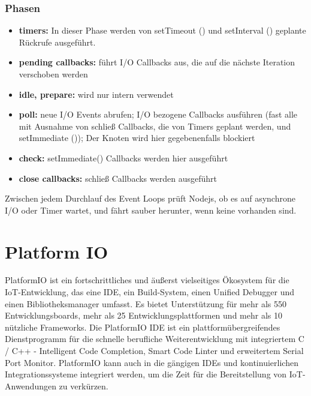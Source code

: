 \subsubsection{Phasen}

\begin{itemize}
    \item \textbf{timers:} In dieser Phase werden von setTimeout () und setInterval () geplante Rückrufe ausgeführt.
    \item \textbf{pending callbacks:} führt I/O Callbacks aus, die auf die nächste Iteration verschoben werden
    \item \textbf{idle, prepare:} wird nur intern verwendet
    \item \textbf{poll:} neue I/O Events abrufen; I/O bezogene Callbacks ausführen (fast alle mit Ausnahme von schließ Callbacks, die von Timers geplant werden, und setImmediate ()); Der Knoten wird hier gegebenenfalls blockiert
    \item \textbf{check:} setImmediate() Callbacks werden hier ausgeführt
    \item \textbf{close callbacks:} schließ Callbacks werden ausgeführt
\end{itemize}

Zwischen jedem Durchlauf des Event Loops prüft Nodejs, ob es auf asynchrone I/O oder Timer wartet, und fährt sauber herunter, wenn keine vorhanden sind.

\cite[Zitiert von der offizielen Nodejs Website]{nodejs_event_loop_how_does_it_work}

\section{Platform IO}\label{sec:platformio}

PlatformIO ist ein fortschrittliches und äußerst vielseitiges Ökosystem für die IoT-Entwicklung, das eine IDE, ein Build-System, einen Unified Debugger und einen Bibliotheksmanager umfasst. Es bietet Unterstützung für mehr als 550 Entwicklungsboards, mehr als 25 Entwicklungsplattformen und mehr als 10 nützliche Frameworks. Die PlatformIO IDE ist ein plattformübergreifendes Dienstprogramm für die schnelle berufliche Weiterentwicklung mit integriertem C / C++ - Intelligent Code Completion, Smart Code Linter und erweitertem Serial Port Monitor. PlatformIO kann auch in die gängigen IDEs und kontinuierlichen Integrationssysteme integriert werden, um die Zeit für die Bereitstellung von IoT-Anwendungen zu verkürzen.\cite{platformio_about_us}

